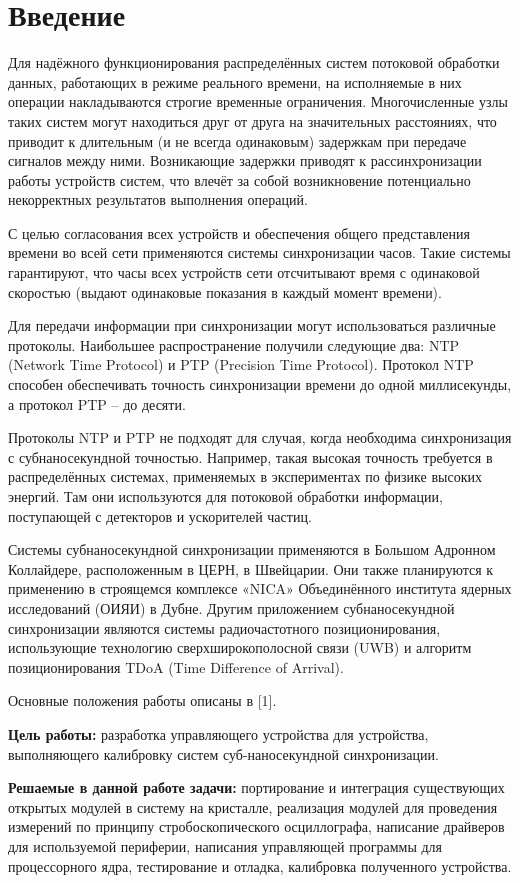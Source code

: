 \chapter*{Введение} %

Для надёжного функционирования распределённых систем потоковой обработки данных, работающих в
режиме реального времени, на исполняемые в них операции накладываются строгие временные ограничения.
Многочисленные узлы таких систем могут находиться друг от друга на значительных расстояниях, 
что приводит к длительным (и не всегда одинаковым) задержкам при передаче сигналов между ними.
Возникающие задержки приводят к рассинхронизации работы устройств систем, что влечёт за собой 
возникновение потенциально некорректных результатов выполнения операций. 

С целью согласования всех устройств и обеспечения общего представления времени во всей сети применяются 
системы синхронизации часов. Такие системы гарантируют, что часы всех устройств сети отсчитывают время с 
одинаковой скоростью (выдают одинаковые показания в каждый момент времени).

Для передачи информации при синхронизации могут использоваться различные протоколы.
Наибольшее распространение получили следующие два: NTP (Network Time Protocol) и PTP (Precision Time Protocol).
Протокол NTP способен обеспечивать точность синхронизации времени до одной миллисекунды, а протокол PTP – до десяти. 

Протоколы NTP и PTP не подходят для случая, когда необходима синхронизация с субнаносекундной точностью. Например, 
такая высокая точность требуется в распределённых системах, применяемых в экспериментах по физике высоких энергий.
Там они используются для потоковой обработки информации, поступающей с детекторов и ускорителей частиц. 

Системы субнаносекундной синхронизации применяются в Большом Адронном Коллайдере, расположенным в ЦЕРН, в Швейцарии. Они также
планируются к применению в строящемся комплексе «NICA» Объединённого института ядерных исследований (ОИЯИ) в Дубне. 
Другим приложением субнаносекундной синхронизации являются системы радиочастотного позиционирования,
использующие технологию сверхширокополосной связи (UWB) и алгоритм позиционирования TDoA (Time Difference of Arrival).

Основные положения работы описаны в [1].

\textbf{Цель работы:} разработка управляющего устройства для устройства, выполняющего калибровку систем суб-наносекундной синхронизации.

\textbf{Решаемые в данной работе задачи:} портирование и интеграция существующих открытых модулей в систему на кристалле, 
реализация модулей для проведения измерений по принципу стробоскопического осциллографа, написание драйверов для используемой периферии,
написания управляющей программы для процессорного ядра, тестирование и отладка, калибровка полученного устройства.